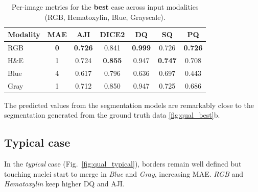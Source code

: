 \documentclass[target=bach,aauheader=,style=]{thud}
\begin{document}
\begin{table}[ht]
\centering
\caption{Per-image metrics for the \textbf{best} case across input modalities (RGB, Hematoxylin, Blue, Grayscale). }
\label{tab:best_metrics}
\begin{tabular}{lcccccc}
\toprule
Modality & MAE & AJI & DICE2 & DQ & SQ & PQ \\
\midrule
RGB  & \textbf{0} & \textbf{0.726} & 0.841 & \textbf{0.999} & 0.726 & \textbf{0.726} \\
H\&E & 1 & 0.724 & \textbf{0.855} & 0.947 & \textbf{0.747} & 0.708 \\
Blue & 4 & 0.617 & 0.796 & 0.636 & 0.697 & 0.443 \\
Gray & 1 & 0.712 & 0.850 & 0.947 & 0.725 & 0.686 \\
\bottomrule
\end{tabular}
\end{table}
The predicted values from the segmentation models are remarkably close to the segmentation generated from the ground truth data \ref{fig:qual_best}b. 
\subsection{Typical case}
In the \emph{typical} case (Fig.~\ref{fig:qual_typical}), borders remain well defined but touching nuclei start to merge in \emph{Blue} and \emph{Gray}, increasing MAE. \emph{RGB} and \emph{Hematoxylin} keep higher DQ and AJI.
\end{document}
